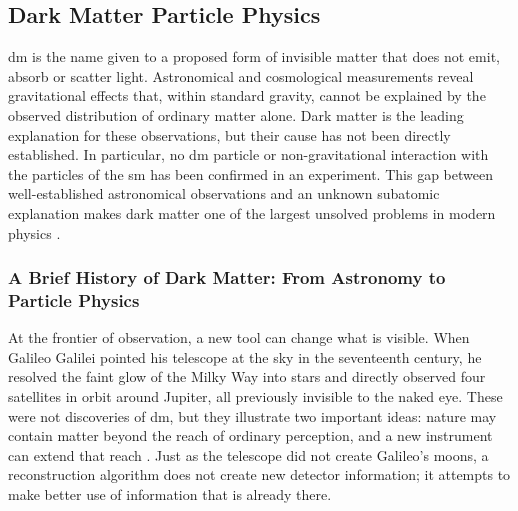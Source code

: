 \subsection{Dark Matter Particle Physics}
\label{sec:dm_particle_physics}

\gls{dm} is the name given to a proposed form of invisible matter that does not
emit, absorb or scatter light. Astronomical and cosmological measurements reveal
gravitational effects that, within standard gravity, cannot be explained by the
observed distribution of ordinary matter alone. Dark matter is the leading
explanation for these observations, but their cause has not been directly
established. In particular, no \gls{dm} particle or non-gravitational interaction
with the particles of the \gls{sm} has been confirmed in an experiment. This gap
between well-established astronomical observations and an unknown subatomic
explanation makes dark matter one of the largest unsolved problems in modern
physics \cite{bertone2016-history-dark-matter,cirelli2026-darkmatter}.

\subsubsection{A Brief History of Dark Matter: From Astronomy to Particle Physics}
\label{sec:history}

At the frontier of observation, a new tool can change what is visible. When
Galileo Galilei pointed his telescope at the sky in the seventeenth century, he
resolved the faint glow of the Milky Way into stars and directly observed four
satellites in orbit around Jupiter, all previously invisible to the naked eye.
These were not discoveries of \gls{dm}, but they illustrate two important ideas:
nature may contain matter beyond the reach of ordinary perception, and a new
instrument can extend that reach \cite{bertone2016-history-dark-matter}. Just as
the telescope did not create Galileo's moons, a reconstruction algorithm does
not create new detector information; it attempts to make better use of
information that is already there.

